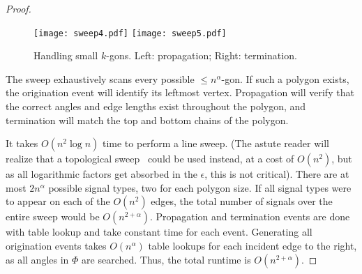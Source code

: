 \documentclass{article}
\begin{document}
\begin{proof}
\begin{figure}[h!]
\center
\texttt{[image: sweep4.pdf]}
\texttt{[image: sweep5.pdf]}
\caption{Handling small $k$-gons.  Left: propagation;  Right: termination.}
\label{smallgons}
\end{figure}


The sweep exhaustively scans every possible ${\leq}n^\alpha$-gon.
If such a polygon exists, the origination event will identify its leftmost vertex.
Propagation will verify that the correct angles and edge lengths exist throughout
the polygon, and termination will match the top and bottom chains of the polygon.

 It takes $O(n^2 \log n)$ time to perform a line
sweep. (The astute reader will realize that a topological sweep~\cite{sweep} could be
used instead, at a cost of $O(n^2)$, but as all logarithmic factors get absorbed in 
the $\epsilon$, this is not critical). 
There are at most $2 n ^{\alpha}$ possible signal types, two for each polygon size.
If all signal types were to appear on each of the $O(n^2)$ edges, the total number of signals 
 over the entire sweep would be $O(n^{2{+}\alpha})$.
Propagation and termination events are done with table lookup and take constant time for each event. Generating all
origination events takes $O(n^{\alpha})$ table lookups for each incident edge to the right,
as all angles in $\Phi$ are searched. Thus, the total runtime is $O(n^{2{+}\alpha})$.
\end{proof}
\end{document}
